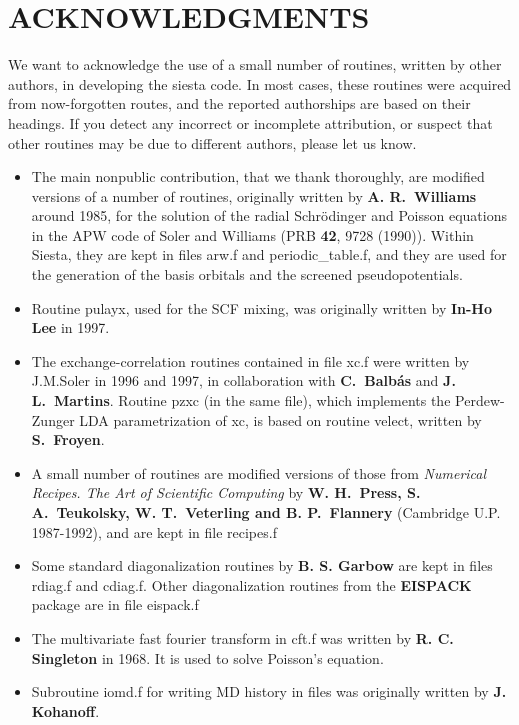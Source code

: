 \documentclass[11pt]{article}
\begin{document}
\section{ACKNOWLEDGMENTS}

We want to acknowledge the use of a small number of routines,
written by other authors, in developing the siesta code.
In most cases, these routines were acquired from now-forgotten 
routes, and the reported authorships are based on their headings.
If you detect any incorrect or incomplete attribution, or suspect
that other routines may be due to different authors, please
let us know.

\begin{itemize}
\item
The main nonpublic contribution, that we thank thoroughly, are modified
versions of a number of routines, originally written by {\bf A. R.\ Williams} 
around 1985, for the solution of the radial Schr\"odinger and Poisson 
equations in the APW code of Soler and Williams (PRB {\bf 42}, 9728 (1990)).
Within {\sc Siesta}, they are kept in files arw.f and periodic\_table.f, 
and they are used for the generation of the basis orbitals and the screened
pseudopotentials.

\item
Routine pulayx, used for the SCF mixing, was originally written by
{\bf In-Ho Lee} in 1997.

\item
The exchange-correlation routines contained in file xc.f were written
by J.M.Soler in 1996 and 1997, in collaboration with {\bf C.\ Balb\'as} 
and {\bf J. L.\ Martins}.
Routine pzxc (in the same file), which implements the Perdew-Zunger
LDA parametrization of xc, is based on routine velect, written by
{\bf S.\ Froyen}.

\item
A small number of routines are modified versions of those from 
{\em Numerical Recipes. The Art of Scientific Computing}
by {\bf W. H.\ Press, S. A.\ Teukolsky, W. T.\ Veterling and B. P.\ Flannery}
(Cambridge U.P. 1987-1992), and are kept in file recipes.f

\item
Some standard diagonalization routines by {\bf B. S. Garbow} are kept
in files rdiag.f and cdiag.f. Other diagonalization routines from
the {\bf EISPACK} package are in file eispack.f

\item
The multivariate fast fourier transform in cft.f was written by
{\bf R. C. Singleton} in 1968. It is used to solve Poisson's equation.

\item
Subroutine iomd.f for writing MD history in files was originally written
by {\bf J. Kohanoff}.
\end{itemize}
\end{document}
